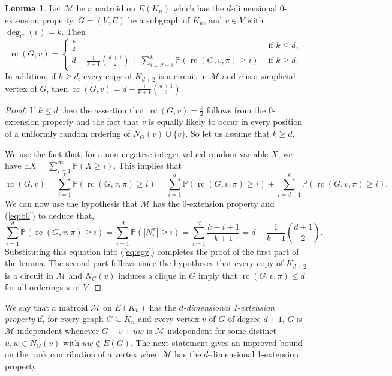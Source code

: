 \documentclass[11pt,a4paper]{article}
\theoremstyle{definition}
\newtheorem{proposition}[theorem]{Lemma}
\DeclareMathOperator{\rc}{rc}
\newcommand{\cM}{\mathcal{M}}
\newcommand{\E}{\mathbb{E}}
\newcommand{\Prob}{\mathbb{P}}
\begin{document}
\begin{proposition}\label{prop:rc:probsum}
Let $\cM$ be a matroid on $E(K_n)$ which has the $d$-dimensional $0$-extension property, $ G=(V,E)$ be a subgraph of $K_n$, and $v\in V$ with $\deg_G(v)=k$.
Then
$$\rc(G, v)= \begin{cases}
\frac{k}{2} &  \text{ if } k\leq d, \\
d-\frac{1}{k+1}{\binom{d+1}{2}} +\sum_{i=d+1}^k \Prob(\rc(G,v,\pi)\geq i) &\mbox{ if $k\geq d$.}
\end{cases}
$$
In addition, if $k\geq d$, every copy of $K_{d+2}$ is a circuit in $\cM$ and $v$ is a simplicial vertex of $G$, then  $\rc(G, v)= d-\frac{1}{k+1}{\binom{d+1}{2}}$.
\end{proposition}
\begin{proof} If $k\leq d$ then the assertion that $\rc(G, v)=\frac{k}{2}$ follows from the $0$-extension property and the fact that $v$ is equally likely to occur in every position of a uniformly random ordering of $N_G(v)\cup \{v\}$.
So let us assume that $k\geq d$.

We use  
the fact that, for a non-negative integer valued random variable $X$, we have $\E X=\sum_{i=1}^\infty \Prob(X\geq i)$. This implies that 
\begin{equation}\label{eq:egy}
\rc(G,v)=\sum_{i=1}^k \Prob(\rc(G,v,\pi)\geq i)=\sum_{i=1}^d \Prob(\rc(G,v,\pi)\geq i)+\sum_{i=d+1}^k \Prob(\rc(G,v,\pi)\geq i).
\end{equation}
We can now use the hypothesis that $\cM$ has the 0-extension property and (\ref{eq:b0}) to deduce that,
$$\sum_{i=1}^d \Prob(\rc(G,v,\pi)\geq i)=\sum_{i=1}^d \Prob(|N_v^\pi|\geq i)%
=\sum_{i=1}^d \frac{k-i+1}{k+1}=d-\frac{1}{k+1}{\binom{d+1}{2}}.$$
Substituting this equation into (\ref{eq:egy}) completes the proof of the first part of the lemma. The second part follows since the hypotheses that every copy of $K_{d+2}$ is a circuit in $\cM$ and $N_G(v)$ induces a clique in $G$ imply that $\rc(G,v,\pi)\leq d$ for all orderings $\pi$ of $V$.
\end{proof}



We say that a matroid $\cM$ on $E(K_n)$ has the {\em $d$-dimensional 1-extension property} if, for every graph $G\subseteq K_n$ and every vertex $v$ of $G$ of degree $d+1$, $G$ is $\cM$-independent whenever $G-v+uw$ is $\cM$-independent for some distinct $u,w\in N_G(v)$ with $uw\notin E(G)$. The next statement gives an improved bound on the rank contribution of a vertex when $\cM$ has the $d$-dimensional 1-extension property.
\end{document}
